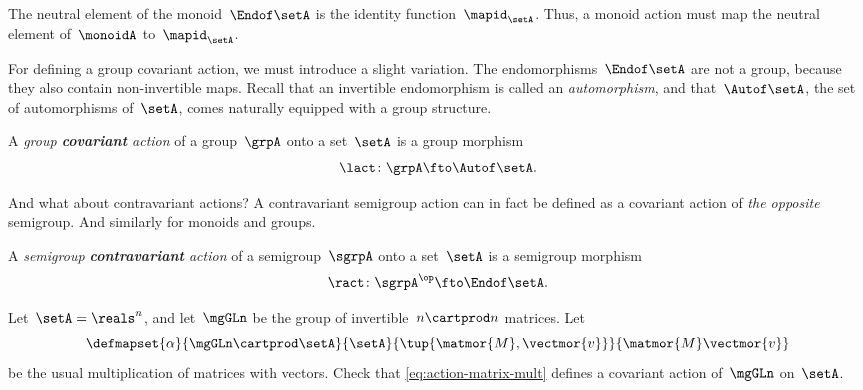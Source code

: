 The neutral element of the monoid~$\Endof\setA$ is the identity function~$\mapid_{\setA}$.
Thus, a monoid action must map the neutral element of~$\monoidA$ to~$\mapid_{\setA}$.
%

For defining a group covariant action, we must introduce a slight variation.
The endomorphisms~$\Endof\setA$ are not a group, because they also contain non-invertible maps.
Recall that an invertible endomorphism is called an \emph{automorphism}, and that~$\Autof\setA$, the set of automorphisms of~$\setA$, comes naturally equipped with a group structure.


\begin{ctdefinition}
    \label{def:group-cov-action}
    A \emph{group \textbf{covariant} action} of a group~$\grpA$ onto a set~$\setA$ is a group morphism
    \begin{equation}
        \label{eq:act-group}
        \lact \colon \grpA \fto \Autof\setA.
    \end{equation}
\end{ctdefinition}

And what about contravariant actions?
A contravariant semigroup action can in fact be defined as a covariant action of \emph{the opposite} semigroup.
And similarly for monoids and groups.

\begin{ctdefinition}
    \label{def:semigroup-cont-action}
    A \emph{semigroup \textbf{contravariant} action} of a semigroup~$\sgrpA$ onto a set~$\setA$ is a semigroup morphism
    \begin{equation}
        \ract \colon \sgrpA^{\op} \fto \Endof\setA.
    \end{equation}
\end{ctdefinition}

\vfill%


\begin{gradedexercise}
    \label{ex:MatrixMultAction}
    Let~$\setA = \reals^n$, and let~$\mgGLn$ be the group of invertible~$n \cartprod n$ matrices.
    Let
    \begin{equation}
        \label{eq:action-matrix-mult}
        \defmapset{
            \alpha
        }{
            \mgGLn \cartprod \setA
        }{
            \setA
        }{
            \tup{\matmor{M}, \vectmor{v}}
        }{
            \matmor{M}\vectmor{v}
        }
    \end{equation}
    be the usual multiplication of matrices with vectors.
    Check that \cref{eq:action-matrix-mult} defines a covariant action of~$\mgGLn$ on~$\setA$.
\end{gradedexercise}

